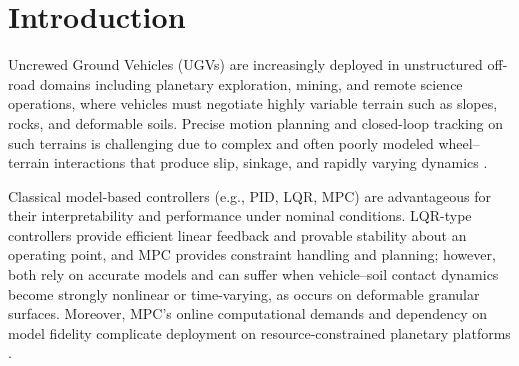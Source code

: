 \documentclass[conference]{IEEEtran}
\begin{document}
\begin{abstract}
goal of enabling multi-robot collaboration on Mars for cooperative tasks such as transporting large rocks or conducting science missions.
\end{abstract}

\section{Introduction}
Uncrewed Ground Vehicles (UGVs) are increasingly deployed in unstructured off-road domains including planetary exploration, mining, and remote science operations, where vehicles must negotiate highly variable terrain such as slopes, rocks, and deformable soils. Precise motion planning and closed-loop tracking on such terrains is challenging due to complex and often poorly modeled wheel--terrain interactions that produce slip, sinkage, and rapidly varying dynamics \cite{mehta2024hybrid, wiberg2021rough, bekker1969introduction}.

Classical model-based controllers (e.g., PID, LQR, MPC) are advantageous for their interpretability and performance under nominal conditions. LQR-type controllers provide efficient linear feedback and provable stability about an operating point, and MPC provides constraint handling and planning; however, both rely on accurate models and can suffer when vehicle--soil contact dynamics become strongly nonlinear or time-varying, as occurs on deformable granular surfaces. Moreover, MPC's online computational demands and dependency on model fidelity complicate deployment on resource-constrained planetary platforms \cite{zhang2023energy, mehta2024hybrid}.
\end{document}
